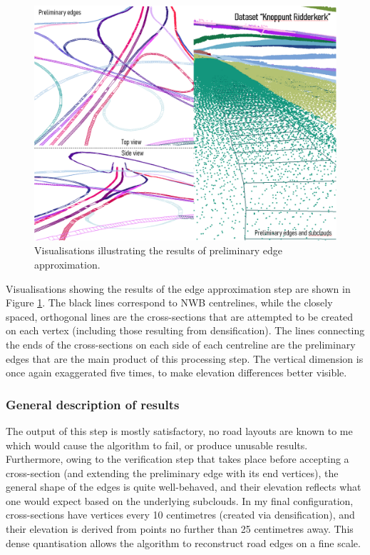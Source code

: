 \begin{figure}[]
    \centering
    \includegraphics[width=0.9\linewidth]{final_report/figs/edgeapproximation0.png}
    \caption{Visualisations illustrating the results of preliminary edge approximation.}
    \label{fig:edgeapproximation0}
\end{figure}

Visualisations showing the results of the edge approximation step are shown in Figure \ref{fig:edgeapproximation0}. The black lines correspond to NWB centrelines, while the closely spaced, orthogonal lines are the cross-sections that are attempted to be created on each vertex (including those resulting from densification). The lines connecting the ends of the cross-sections on each side of each centreline are the preliminary edges that are the main product of this processing step. The vertical dimension is once again exaggerated five times, to make elevation differences better visible.

\subsubsection{General description of results}

The output of this step is mostly satisfactory, no road layouts are known to me which would cause the algorithm to fail, or produce unusable results. Furthermore, owing to the verification step that takes place before accepting a cross-section (and extending the preliminary edge with its end vertices), the general shape of the edges is quite well-behaved, and their elevation reflects what one would expect based on the underlying subclouds. In my final configuration, cross-sections have vertices every 10 centimetres (created via densification), and their elevation is derived from points no further than 25 centimetres away. This dense quantisation allows the algorithm to reconstruct road edges on a fine scale.

